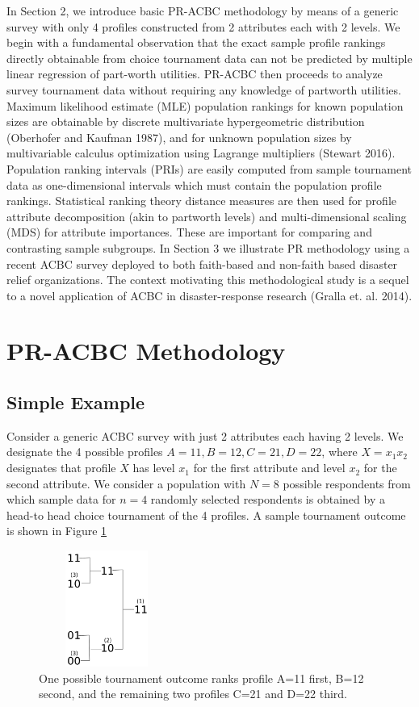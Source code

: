 \documentclass[a4paper, 12pt]{article}
\begin{document}
In Section 2, we introduce basic PR-ACBC methodology by means of a generic survey with only 4 profiles constructed from 2 attributes each with 2 levels. We begin with a fundamental observation that the exact sample profile rankings directly obtainable from choice tournament data can not be predicted by multiple linear regression of part-worth utilities.  PR-ACBC then proceeds to analyze  survey tournament data without requiring any knowledge of partworth utilities.  Maximum likelihood estimate (MLE) population rankings for known population sizes are obtainable by discrete multivariate hypergeometric distribution (Oberhofer and Kaufman 1987), and  for unknown population sizes by multivariable calculus optimization using Lagrange multipliers (Stewart 2016).   Population ranking intervals (PRIs) are easily computed from sample tournament data as one-dimensional intervals which must contain the population profile rankings. Statistical ranking theory distance measures are then used for profile attribute decomposition (akin to partworth levels) and multi-dimensional scaling (MDS) for attribute importances. These are important for comparing and contrasting sample subgroups.  In Section 3 we illustrate PR methodology using a recent ACBC survey deployed to both faith-based and non-faith based disaster relief organizations.    The context motivating this methodological study is a sequel to a novel application of ACBC in disaster-response research (Gralla et. al. 2014).



\section{PR-ACBC Methodology}

\subsection{Simple Example}

Consider a generic ACBC survey with just 2 attributes each having 2 levels. We designate the 4 possible profiles $A=11, B=12, C=21, D=22$, where $X=x_1x_2$ designates that profile $X$ has level $x_1$ for the first attribute and level $x_2$ for the second attribute. We consider a population with $N=8$ possible respondents from which sample data for $n=4$ randomly selected respondents is obtained by a head-to head choice tournament of the 4 profiles.  A sample tournament outcome is shown in Figure \ref{SimpleTourn}
\begin{figure}[!htpb]
\centering
\includegraphics[width=1.75in, height=1.5in]{SimpleTourn.png}
\caption{One possible tournament outcome ranks profile A=11 first, B=12 second, and the remaining two profiles C=21 and D=22 third.  }
\label{SimpleTourn}
\end{figure}
\end{document}
